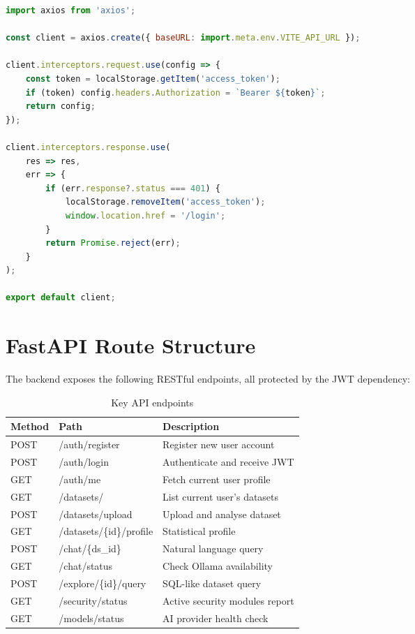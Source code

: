 \documentclass[12pt,a4paper]{report}
\begin{document}
\begin{lstlisting}[language=JavaScript, caption={API client with JWT interceptor (frontend/src/api/client.js)}]
import axios from 'axios';

const client = axios.create({ baseURL: import.meta.env.VITE_API_URL });

client.interceptors.request.use(config => {
    const token = localStorage.getItem('access_token');
    if (token) config.headers.Authorization = `Bearer ${token}`;
    return config;
});

client.interceptors.response.use(
    res => res,
    err => {
        if (err.response?.status === 401) {
            localStorage.removeItem('access_token');
            window.location.href = '/login';
        }
        return Promise.reject(err);
    }
);

export default client;
\end{lstlisting}

\section{FastAPI Route Structure}

The backend exposes the following RESTful endpoints, all protected by the JWT dependency:

\begin{table}[H]
\centering
\caption{Key API endpoints}
\begin{tabularx}{\textwidth}{llX}
\toprule
\textbf{Method} & \textbf{Path} & \textbf{Description} \\
\midrule
POST & /auth/register            & Register new user account \\
POST & /auth/login               & Authenticate and receive JWT \\
GET  & /auth/me                  & Fetch current user profile \\
GET  & /datasets/                & List current user's datasets \\
POST & /datasets/upload          & Upload and analyse dataset \\
GET  & /datasets/\{id\}/profile  & Statistical profile \\
POST & /chat/\{ds\_id\}          & Natural language query \\
GET  & /chat/status              & Check Ollama availability \\
POST & /explore/\{id\}/query     & SQL-like dataset query \\
GET  & /security/status          & Active security modules report \\
GET  & /models/status            & AI provider health check \\
\bottomrule
\end{tabularx}
\end{table}
\end{document}
